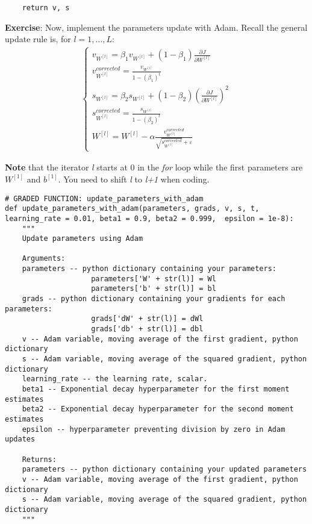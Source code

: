 {\begin{verbatim}
    return v, s
\end{verbatim}




{\textbf{Exercise}}:  Now, implement the parameters update with Adam. Recall the general update rule is, for $l = 1, ..., L$: 
\begin{align*}
\begin{cases}
v_{W^{[l]}} = \beta_1 v_{W^{[l]}} + (1 - \beta_1) \frac{\partial J }{ \partial W^{[l]} } \\
v^{corrected}_{W^{[l]}} = \frac{v_{W^{[l]}}}{1 - (\beta_1)^t} \\
s_{W^{[l]}} = \beta_2 s_{W^{[l]}} + (1 - \beta_2) (\frac{\partial J }{\partial W^{[l]} })^2 \\
s^{corrected}_{W^{[l]}} = \frac{s_{W^{[l]}}}{1 - (\beta_2)^t} \\
W^{[l]} = W^{[l]} - \alpha \frac{v^{corrected}_{W^{[l]}}}{\sqrt{s^{corrected}_{W^{[l]}}}+\varepsilon}
\end{cases}
\end{align*}

{\textbf{Note}} that the iterator \emph{l} starts at 0 in the \emph{for} loop while the first parameters are $W^{[1]}$ and $b^{[1]}$. You need to shift \emph{l} to \emph{l+1} when coding.

\begin{verbatim}
# GRADED FUNCTION: update_parameters_with_adam
def update_parameters_with_adam(parameters, grads, v, s, t, learning_rate = 0.01, beta1 = 0.9, beta2 = 0.999,  epsilon = 1e-8):
    """
    Update parameters using Adam
    
    Arguments:
    parameters -- python dictionary containing your parameters:
                    parameters['W' + str(l)] = Wl
                    parameters['b' + str(l)] = bl
    grads -- python dictionary containing your gradients for each parameters:
                    grads['dW' + str(l)] = dWl
                    grads['db' + str(l)] = dbl
    v -- Adam variable, moving average of the first gradient, python dictionary
    s -- Adam variable, moving average of the squared gradient, python dictionary
    learning_rate -- the learning rate, scalar.
    beta1 -- Exponential decay hyperparameter for the first moment estimates 
    beta2 -- Exponential decay hyperparameter for the second moment estimates 
    epsilon -- hyperparameter preventing division by zero in Adam updates

    Returns:
    parameters -- python dictionary containing your updated parameters 
    v -- Adam variable, moving average of the first gradient, python dictionary
    s -- Adam variable, moving average of the squared gradient, python dictionary
    """
    

\end{verbatim}}
